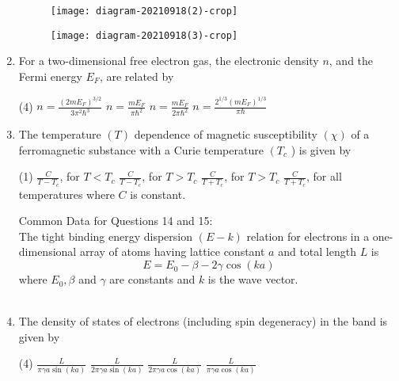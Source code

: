 \begin{enumerate}
\begin{tasks}
\begin{figure}[H]
\end{figure}
\task[\textbf{C.}] \begin{figure}[H]
	\centering
	\texttt{[image: diagram-20210918(2)-crop]}
\end{figure}
\task[\textbf{D.}] \begin{figure}[H]
	\centering
	\texttt{[image: diagram-20210918(3)-crop]}
\end{figure}
\end{tasks}
	\item For a two-dimensional free electron gas, the electronic density $n$, and the Fermi energy $E_{F}$, are related by
{	}
\begin{tasks}(4)
\task[\textbf{A.}] $n=\frac{\left(2 m E_{F}\right)^{3 / 2}}{3 \pi^{2} \hbar^{3}}$
\task[\textbf{B.}] $n=\frac{m E_{F}}{\pi \hbar^{2}}$
\task[\textbf{C.}] $n=\frac{m E_{F}}{2 \pi \hbar^{2}}$
\task[\textbf{D.}] $n=\frac{2^{1 / 3}\left(m E_{F}\right)^{1 / 3}}{\pi \hbar}$
\end{tasks}
	\item The temperature $(T)$ dependence of magnetic susceptibility $(\chi)$ of a ferromagnetic substance with a Curie temperature $\left(T_{c}\right.$ ) is given by
{	}
\begin{tasks}(1)
\task[\textbf{A.}]  $\frac{C}{T-T_{c}}$, for $T<T_{c}$
\task[\textbf{B.}] $\frac{C}{T-T_{c}}$, for $T>T_{c}$
\task[\textbf{C.}] $\frac{C}{T+T_{c}}$, for $T>T_{c}$
\task[\textbf{D.}] $\frac{C}{T+T_{c}}$, for all temperatures
where $C$ is constant.
\end{tasks}
	Common Data for Questions 14 and 15:\\
	The tight binding energy dispersion $(E-k)$ relation for electrons in a one-dimensional array of atoms having lattice constant $a$ and total length $L$ is
	$$
	E=E_{0}-\beta-2 \gamma \cos (k a)
	$$
	where $E_{0}, \beta$ and $\gamma$ are constants and $k$ is the wave vector.\\\\
	\item The density of states of electrons (including spin degeneracy) in the band is given by
{	}
\begin{tasks}(4)
\task[\textbf{A.}] $\frac{L}{\pi \gamma a \sin (k a)}$
\task[\textbf{B.}] $\frac{L}{2 \pi \gamma a \sin (k a)}$
\task[\textbf{C.}] $\frac{L}{2 \pi \gamma a \cos (k a)}$
\task[\textbf{D.}] $\frac{L}{\pi \gamma a \cos (k a)}$
\end{tasks}

\end{enumerate}
